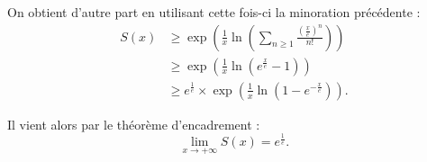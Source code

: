 On obtient d'autre part en utilisant cette fois-ci la minoration précédente : 
\begin{align*}
S(x) & \geq \exp\left( \frac{1}{x}\ln\left( \sum_{n\geq 1}\frac{(\frac{x}{e})^{n}}{n!}\right)\right)\\
& \geq \exp\left( \frac{1}{x}\ln(e^{\frac{x}{e}}-1)\right)\\
& \geq e^{\frac{1}{e}}\times \exp\left( \frac{1}{x}\ln(1-e^{-\frac{x}{e}})\right).
\end{align*}

Il vient alors par le théorème d'encadrement : $$\lim_{x\rightarrow +\infty} S(x)=e^{\frac{1}{e}}.$$


